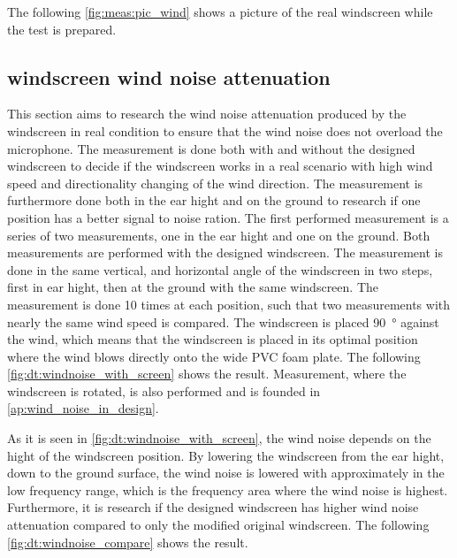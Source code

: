 
The following \autoref{fig:meas:pic_wind} shows a picture of the real windscreen while the test is prepared.  




\subsection{windscreen wind noise attenuation}\label{sec:ds:wind_noi_att}
This section aims to research the wind noise attenuation produced by the windscreen in real condition to ensure that the wind noise does not overload the microphone. The measurement is done both with and without the designed windscreen to decide if the windscreen works in a real scenario with high wind speed and directionality changing of the wind direction. The measurement is furthermore done both in the ear hight and on the ground to research if one position has a better signal to noise ration. The first performed measurement is a series of two measurements, one in the ear hight and one on the ground. Both measurements are performed with the designed windscreen. The measurement is done in the same vertical, and horizontal angle of the windscreen in two steps, first in ear hight, then at the ground with the same windscreen. The measurement is done 10 times at each position, such that two measurements with nearly the same wind speed is compared. The windscreen is placed \SI{90}{\degree} against the wind, which means that the windscreen is placed in its optimal position where the wind blows directly onto the wide PVC foam plate. The following \autoref{fig:dt:windnoise_with_screen} shows the result. Measurement, where the windscreen is rotated, is also performed and is founded in \autoref{ap:wind_noise_in_design}.


As it is seen in \autoref{fig:dt:windnoise_with_screen}, the wind noise depends on the hight of the windscreen position. By lowering the windscreen from the ear hight, down to the ground surface, the wind noise is lowered with approximately  in the low frequency range, which is the frequency area where the wind noise is highest. Furthermore, it is research if the designed windscreen has higher wind noise attenuation compared to only the modified original windscreen. The following \autoref{fig:dt:windnoise_compare} shows the result.
 
